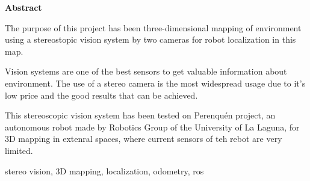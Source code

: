 \documentclass[spanish,a4paper,14pt,oneside]{extreport}
\newenvironment{summary}
{\par\noindent\begin{center}\textbf{Abstract}\end{center}\begin{itshape}\par\noindent}
{\end{itshape}}
\newenvironment{keywords}
{\begin{list}{}{\setlength{\leftmargin}{1em}}\item[\hskip\labelsep \bfseries Keywords:]}
{\end{list}}
\begin{document}
\newpage  %
\begin{summary}
{\em

The purpose of this project has been three-dimensional mapping of environment
using a stereostopic vision system by two cameras for robot localization in this
map.

\bigskip
Vision systems are one of the best sensors to get valuable information about
environment. The use of a stereo camera is the most widespread usage due to it's
low price and the good results that can be achieved.

\bigskip
This stereoscopic vision system has been tested on Perenquén project, an
autonomous robot made by Robotics Group of the University of La Laguna, for 3D
mapping in extenral spaces, where current sensors of teh rebot are very limited.
}

\begin{keywords}
stereo vision, 3D mapping, localization, odometry, ros
\end{keywords}

\end{summary}

\newpage{\pagestyle{empty}}
\thispagestyle{empty}



\pagestyle{myheadings} %

\renewcommand{\thepage}{\roman{page}}
\setcounter{page}{1}


\tableofcontents

\newpage{\pagestyle{empty}}

\listoffigures

\newpage{\pagestyle{empty}}
\end{document}
